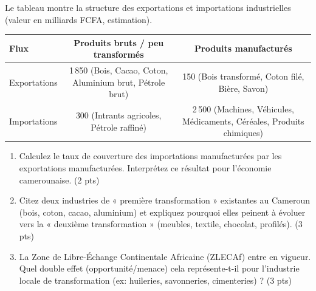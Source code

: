\documentclass[11pt]{article}
\begin{document}
\begin{exercice}
Le tableau montre la structure des exportations et importations industrielles (valeur en milliards FCFA, estimation).

\begin{center}
\begin{tabular}{|l|c|c|}
\hline
\textbf{Flux} & \textbf{Produits bruts / peu transformés} & \textbf{Produits manufacturés} \\
\hline
Exportations & 1\,850 (Bois, Cacao, Coton, Aluminium brut, Pétrole brut) & 150 (Bois transformé, Coton filé, Bière, Savon) \\
\hline
Importations & 300 (Intrants agricoles, Pétrole raffiné) & 2\,500 (Machines, Véhicules, Médicaments, Céréales, Produits chimiques) \\
\hline
\end{tabular}
\end{center}

\begin{enumerate}
    \item Calculez le taux de couverture des importations manufacturées par les exportations manufacturées. Interprétez ce résultat pour l'économie camerounaise. (2 pts)
    \item Citez deux industries de « première transformation » existantes au Cameroun (bois, coton, cacao, aluminium) et expliquez pourquoi elles peinent à évoluer vers la « deuxième transformation » (meubles, textile, chocolat, profilés). (3 pts)
    \item La Zone de Libre-Échange Continentale Africaine (ZLECAf) entre en vigueur. Quel double effet (opportunité/menace) cela représente-t-il pour l'industrie locale de transformation (ex: huileries, savonneries, cimenteries) ? (3 pts)
\end{enumerate}
\end{exercice}
\end{document}
